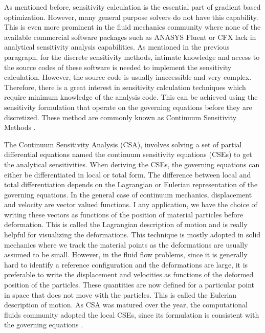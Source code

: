 As mentioned before, sensitivity calculation is the essential part of gradient based optimization. However, many general purpose solvers do not have this capability. This is even more prominent in the fluid mechanics community where none of the available commercial software packages such as ANASYS Fluent or CFX lack in analytical sensitivity analysis capabilities. As mentioned in the previous paragraph, for the discrete sensitivity methods, intimate knowledge and access to the source codes of these software is needed to implement the sensitivity calculation. However, the source code is usually inaccessible and very complex. Therefore, there is a great interest in sensitivity calculation techniques which require minimum knowledge of the analysis code. This can be achieved using the sensitivity formulation that operate on the governing equations before they are discretized. These method are commonly known as Continuum Sensitivity Methods \cite{haftka1989recent}.

The Continuum Sensitivity Analysis (CSA), involves solving a set of partial differential equations named the continuum sensitivity equations (CSEs) to get the analytical sensitivities. When deriving the CSEs, the governing equations can either be differentiated in local or total form. The difference between local and total differentiation depends on the Lagrangian or Eulerian representation of the governing equations. In the general case of continuum mechanics,  displacement and velocity are vector valued functions. I any application, we have the choice of writing these vectors as functions of the position of material particles before deformation. This is called the Lagrangian description of motion and is really helpful for visualizing the deformations. This technique is mostly adopted in solid mechanics where we track the material points as the deformations are usually assumed to be small. However, in the fluid flow problems, since it is generally hard to identify a reference configuration and the deformations are large, it is preferable to write the displacement and velocities as functions of the deformed position of the particles. These quantities are now defined for a particular point in space that does not move with the particles. This is called the Eulerian description of motion.  As CSA was matured over the year, the computational fluids community adopted the local CSEs, since its formulation is consistent with the governing equations \cite{borggaard1997pde, hristova2006continuous}. 


